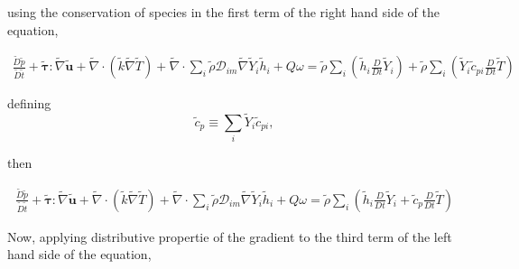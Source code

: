 \documentclass[preprint,12pt,authoryear]{elsarticle}
\begin{document}
using the conservation of species in the first term of 
the right hand side of the equation, 

\begin{equation}
\begin{split}
        \frac{\tilde{D} \tilde{p}}{\tilde{D}\tilde{t}}
        +       
        \pmb{\tilde{\tau}}:\tilde{\nabla} \tilde{\mathbf{u}} 
        + 
        \tilde{\nabla} \cdot (\tilde{k}\tilde{\nabla} \tilde{T})
        +
        \tilde{\nabla} \cdot
        \sum\limits_i 
        \tilde{\rho}\mathcal{D}_{im}\tilde{\nabla}\tilde{Y}_i     
        \tilde{h}_i
        +
	Q\omega
        =
        \tilde{\rho}
        \sum\limits_i
        \left(
                \tilde{h}_i
                \frac{D}{Dt}
		\tilde{Y}_i
	\right)
        +
        \tilde{\rho}
        \sum\limits_i
        \left(
                \tilde{Y}_i
                \tilde{c}_{pi}
                \frac{D}{Dt}
		\tilde{T}
        \right)
\end{split}
\end{equation}

defining 
\[
     \tilde{c}_p \equiv \sum\limits_i \tilde{Y}_i \tilde{c}_{pi},
\]

then

\begin{equation}
\begin{split}
        \frac{\tilde{D} \tilde{p}}{\tilde{D}\tilde{t}}
        +       
        \pmb{\tilde{\tau}}:\tilde{\nabla} \tilde{\mathbf{u}} 
        + 
        \tilde{\nabla} \cdot (\tilde{k}\tilde{\nabla} \tilde{T})
        +
        \tilde{\nabla} \cdot
        \sum\limits_i 
        \tilde{\rho}\mathcal{D}_{im}\tilde{\nabla}\tilde{Y}_i     
        \tilde{h}_i
        +
	Q\omega
        =
        \tilde{\rho}
        \sum\limits_i
        \left(
                \tilde{h}_i
                \frac{D}{Dt}
		\tilde{Y}_i
                +
		\tilde{c}_{p}
                \frac{D}{Dt}
		\tilde{T}
        \right)
\end{split}
\end{equation}



Now, applying distributive propertie of the gradient to the third term  of the left hand side of the equation, 
\end{document}
